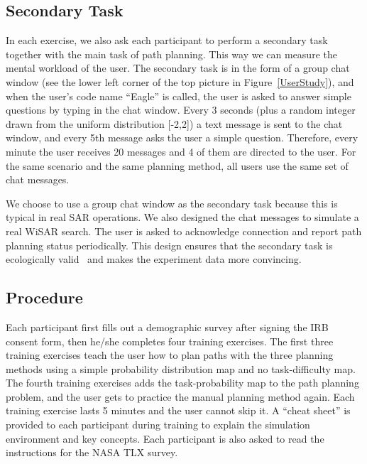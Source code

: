 \documentclass[journal]{IEEEtran}
\begin{document}
\subsection{Secondary Task}

In each exercise, we also ask each participant to perform a secondary task together with the main task of path planning. This way we can measure the mental workload of the user. The secondary task is in the form of a group chat window (see the lower left corner of the top picture in Figure~\ref{UserStudy}), and when the user's code name ``Eagle'' is called, the user is asked to answer simple questions by typing in the chat window. Every 3 seconds (plus a random integer drawn from the uniform distribution [-2,2]) a text message is sent to the chat window, and every 5th message asks the user a simple question. Therefore, every minute the user receives 20 messages and 4 of them are directed to the user. For the same scenario and the same planning method, all users use the same set of chat messages.

We choose to use a group chat window as the secondary task because this is typical in real SAR operations. We also designed the chat messages to simulate a real WiSAR search. The user is asked to acknowledge connection and report path planning status periodically. This design ensures that the secondary task is ecologically valid~\cite{Vicente1997Should,Rasmussen1994Cognitive} and makes the experiment data more convincing.

\subsection{Procedure}

Each participant first fills out a demographic survey after signing the IRB consent form, then he/she completes four training exercises. The first three training exercises teach the user how to plan paths with the three planning methods using a simple probability distribution map and no task-difficulty map. The fourth training exercises adds the task-probability map to the path planning problem, and the user gets to practice the manual planning method again. Each training exercise lasts 5 minutes and the user cannot skip it. A ``cheat sheet'' is provided to each participant during training to explain the simulation environment and key concepts. Each participant is also asked to read the instructions for the NASA TLX survey.
\end{document}
